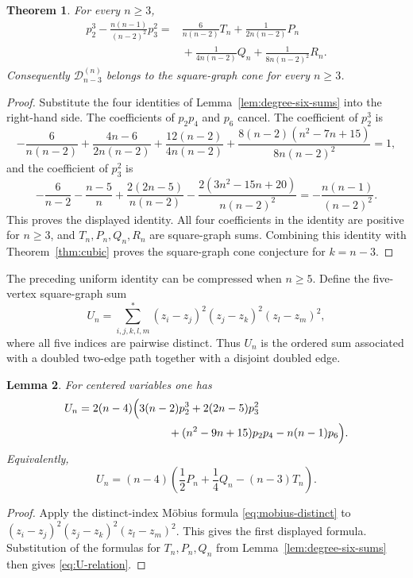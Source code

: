 \documentclass[11pt]{amsart}
\numberwithin{equation}{section}
\newtheorem{theorem}{Theorem}
\newtheorem{lemma}[theorem]{Lemma}
\newcommand{\D}{\mathcal D}
\begin{document}
\begin{theorem}\label{thm:cubic-square-expansion}
For every $n\ge3$,
\[
\begin{aligned}
 p_2^3-\frac{n(n-1)}{(n-2)^2}p_3^2
={}&\frac{6}{n(n-2)}T_n
 +\frac{1}{2n(n-2)}P_n\\
&{} +\frac{1}{4n(n-2)}Q_n
 +\frac{1}{8n(n-2)^2}R_n .
\end{aligned}
\]
Consequently $\D_{n-3}^{(n)}$ belongs to the square-graph cone for every
$n\ge3$.
\end{theorem}

\begin{proof}
Substitute the four identities of Lemma~\ref{lem:degree-six-sums} into the
right-hand side.  The coefficients of $p_2p_4$ and $p_6$ cancel.  The
coefficient of $p_2^3$ is
\[
-\frac{6}{n(n-2)}+\frac{4n-6}{2n(n-2)}
+\frac{12(n-2)}{4n(n-2)}
+\frac{8(n-2)(n^2-7n+15)}{8n(n-2)^2}=1,
\]
and the coefficient of $p_3^2$ is
\[
-\frac{6}{n-2}-\frac{n-5}{n}
+\frac{2(2n-5)}{n(n-2)}
-\frac{2(3n^2-15n+20)}{n(n-2)^2}
=-\frac{n(n-1)}{(n-2)^2}.
\]
This proves the displayed identity.  All four coefficients in the identity are
positive for $n\ge3$, and $T_n,P_n,Q_n,R_n$ are square-graph sums.  Combining
this identity with Theorem~\ref{thm:cubic} proves the square-graph cone
conjecture for $k=n-3$.
\end{proof}


\medskip
The preceding uniform identity can be compressed when $n\ge5$.  Define the
five-vertex square-graph sum
\[
U_n=\sum_{i,j,k,l,m}^{*}
(z_i-z_j)^2(z_j-z_k)^2(z_l-z_m)^2,
\]
where all five indices are pairwise distinct.  Thus $U_n$ is the ordered sum
associated with a doubled two-edge path together with a disjoint doubled
edge.

\begin{lemma}\label{lem:five-vertex-sum}
For centered variables one has
\begin{align*}
U_n={}&2(n-4)\Big(3(n-2)p_2^3+2(2n-5)p_3^2\\
&\hspace{2.4cm} +(n^2-9n+15)p_2p_4-n(n-1)p_6\Big).
\end{align*}
Equivalently,
\begin{equation}\label{eq:U-relation}
U_n=(n-4)\left(\frac12P_n+\frac14Q_n-(n-3)T_n\right).
\end{equation}
\end{lemma}

\begin{proof}
Apply the distinct-index M\"obius formula
\eqref{eq:mobius-distinct} to
$(z_i-z_j)^2(z_j-z_k)^2(z_l-z_m)^2$.  This gives the first displayed
formula.  Substitution of the formulas for $T_n,P_n,Q_n$ from
Lemma~\ref{lem:degree-six-sums} then gives \eqref{eq:U-relation}.
\end{proof}
\end{document}

